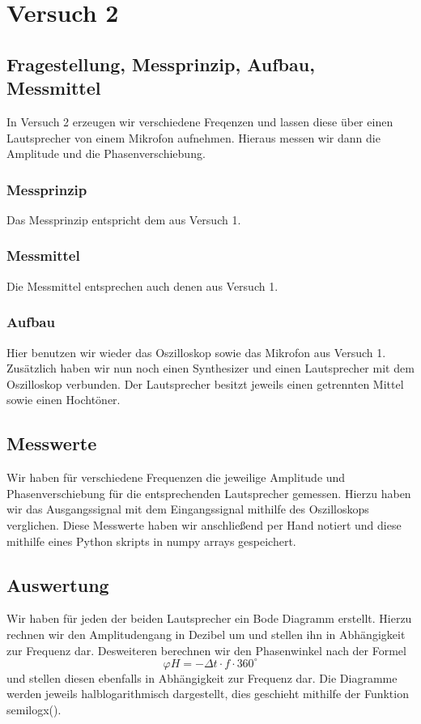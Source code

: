 \documentclass[TGAI_Laborbericht.tex]{subfiles}
\begin{document}
\chapter{Versuch 2}
\label{chap:VERSUCH_2}


\section{Fragestellung, Messprinzip, Aufbau, Messmittel}
\label{chap:VERSUCH_2_FRAGESTELLUNG}
In Versuch 2 erzeugen wir verschiedene Freqenzen und lassen diese über einen Lautsprecher von einem Mikrofon aufnehmen. Hieraus messen wir dann die Amplitude und die Phasenverschiebung. 

\subsection{Messprinzip}
Das Messprinzip entspricht dem aus Versuch 1.

\subsection{Messmittel}
Die Messmittel entsprechen auch denen aus Versuch 1.

\subsection{Aufbau}
Hier benutzen wir wieder das Oszilloskop sowie das Mikrofon aus Versuch 1. Zusätzlich haben wir nun noch einen Synthesizer und einen Lautsprecher mit dem Oszilloskop verbunden. Der Lautsprecher besitzt jeweils einen getrennten Mittel sowie einen Hochtöner.

\section{Messwerte}
\label{chap:VERSUCH_2_MESSWERTE}
Wir haben für verschiedene Frequenzen die jeweilige Amplitude und Phasenverschiebung für die entsprechenden Lautsprecher gemessen. Hierzu haben wir das Ausgangssignal mit dem Eingangssignal mithilfe des Oszilloskops verglichen. Diese Messwerte haben wir anschließend per Hand notiert und diese mithilfe eines Python skripts in numpy arrays gespeichert. 


\section{Auswertung}
\label{chap:VERSUCH_2_AUSWERTUNG}
Wir haben für jeden der beiden Lautsprecher ein Bode Diagramm erstellt. Hierzu rechnen wir den Amplitudengang in Dezibel um und stellen ihn in Abhängigkeit zur Frequenz dar. Desweiteren berechnen wir den Phasenwinkel nach der Formel \[\varphi H = -\Delta t\cdot f \cdot 360^\circ\] und stellen diesen ebenfalls in Abhängigkeit zur Frequenz dar. Die Diagramme werden jeweils halblogarithmisch dargestellt, dies geschieht mithilfe der Funktion semilogx().
\end{document}
